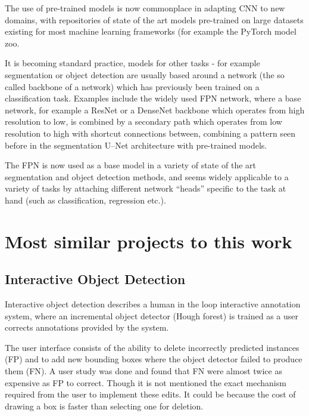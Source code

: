 The use of pre-trained models is now commonplace in adapting \gls{CNN} to new domains, with repositories of state of the art models pre-trained on large datasets existing for most machine learning frameworks (for example the PyTorch \cite{Paszke2017} model zoo. 

It is becoming standard practice, models for other tasks - for example segmentation or object detection are usually based around a network (the so called backbone of a network) which has previously been trained on a classification task. Examples include the widely used \gls{FPN} network, \cite{Lin2017a} where a base network, for example a ResNet \cite{He} or a DenseNet \cite{Huang2016} backbone which operates from high resolution to low, is combined by a secondary path which operates from low resolution to high with shortcut connections between, combining a pattern seen before in the segmentation U--Net \cite{Ronneberger2015a} architecture with pre-trained models.

The \gls{FPN} is now used as a base model in a variety of state of the art segmentation and object detection methods, and seems widely applicable to a variety of tasks by attaching different network ``heads'' specific to the task at hand (such as classification, regression etc.).




\section {Most similar projects to this work}
\label{sec:closest}

\subsection {Interactive Object Detection \cite{Yao2012}}
Interactive object detection \cite{Yao2012} describes a human in the loop interactive annotation system, where an incremental object detector (Hough forest) is trained as a user corrects annotations provided by the system. 

The user interface consists of the ability to delete incorrectly predicted instances (\gls{FP}) and to add new bounding boxes where the object detector failed to produce them (\gls{FN}). A user study was done and found that \gls{FN} were almost twice as expensive as \gls{FP} to correct. Though it is not mentioned the exact mechanism required from the user to implement these edits. It could be because the cost of drawing a box is faster than selecting one for deletion.


